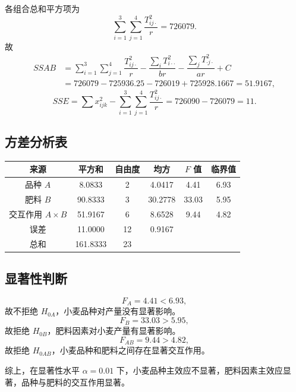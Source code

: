 \documentclass{article}
\begin{document}
各组合总和平方项为
\[
    \sum_{i=1}^{3}\sum_{j=1}^{4}\dfrac{T_{ij\cdot}^{2}}{r}=726079.
\]
故
\[
\begin{aligned}
    SSAB
    &=\sum_{i=1}^{3}\sum_{j=1}^{4}\dfrac{T_{ij\cdot}^{2}}{r}
      -\dfrac{\sum_i T_{i\cdot\cdot}^{2}}{br}
      -\dfrac{\sum_j T_{\cdot j\cdot}^{2}}{ar}
      +C\\
    &=726079-725936.25-726019+725928.1667=51.9167,
\end{aligned}
\]
\[
    SSE=\sum x_{ijk}^{2}-\sum_{i=1}^{3}\sum_{j=1}^{4}\dfrac{T_{ij\cdot}^{2}}{r}
       =726090-726079=11.
\]

\subsection{方差分析表}

\begin{center}
    \setlength{\tabcolsep}{10pt}
    \renewcommand{\arraystretch}{1.25}
    \begin{tabular}{|c|c|c|c|c|c|}
        \hline
        来源 & 平方和 & 自由度 & 均方 & $F$ 值 & 临界值 \\
        \hline
        品种 $A$ & 8.0833 & 2 & 4.0417 & 4.41 & 6.93 \\
        \hline
        肥料 $B$ & 90.8333 & 3 & 30.2778 & 33.03 & 5.95 \\
        \hline
        交互作用 $A\times B$ & 51.9167 & 6 & 8.6528 & 9.44 & 4.82 \\
        \hline
        误差 & 11.0000 & 12 & 0.9167 &  &  \\
        \hline
        总和 & 161.8333 & 23 &  &  &  \\
        \hline
    \end{tabular}
\end{center}

\subsection{显著性判断}

\[
    F_A=4.41<6.93,
\]
故不拒绝 $H_{0A}$，小麦品种对产量没有显著影响。
\[
    F_B=33.03>5.95,
\]
故拒绝 $H_{0B}$，肥料因素对小麦产量有显著影响。
\[
    F_{AB}=9.44>4.82,
\]
故拒绝 $H_{0AB}$，小麦品种和肥料之间存在显著交互作用。

综上，在显著性水平 $\alpha=0.01$ 下，小麦品种主效应不显著，肥料因素主效应显著，品种与肥料的交互作用显著。
\end{document}
